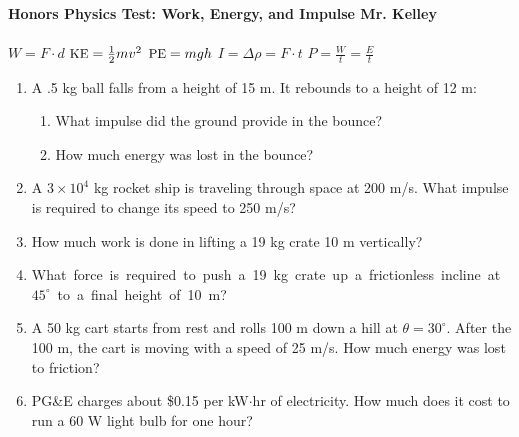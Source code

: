 \documentclass[12pt]{report}
\newcommand{\ke}{\mbox{\small KE}}
\newcommand{\pe}{\mbox{\small PE}}
\begin{document}
{\bf{Honors Physics} \hfill {Test: Work, Energy, and Impulse} \hfill {Mr. Kelley}} \\ \\
\mbox{} \hfill $W=F\cdot d$ \hfill $\ke = \frac{1}{2}mv^2$ \hfill $\pe = mgh$ \hfill $I = \Delta \rho = F\cdot t$ \hfill $P = \frac{W}{t}=\frac{E}{t}$ \hfill \mbox{}
\begin{center}
\end{center}
\begin{enumerate}
\item A .5 kg ball falls from a height of 15 m.  It rebounds to a height of 12 m:
\begin{enumerate}
\item What impulse did the ground provide in the bounce?
\item How much energy was lost in the bounce?
\end{enumerate}
\vfill
\item A $3 \times 10^4$ kg rocket ship is traveling through space at 200 m/s.  What impulse is required to change its speed to 250 m/s?
\vfill
\item How much work is done in lifting a 19 kg crate 10 m vertically?
\vfill
\item \mbox{What force is required to push a 19 kg crate up a frictionless incline at $45^\circ$ to a final height of 10 m?}
\vfill
\item A 50 kg cart starts from rest and rolls 100 m down a hill at $\theta = 30^\circ$.  After the 100 m, the cart is moving with a speed of 25 m/s.  How much energy was lost to friction?
\vfill
\item PG\&E charges about \$0.15 per kW$\cdot$hr of electricity.  How much does it cost to run a 60 W light bulb for one hour?
\vfill
\end{enumerate}
\end{document}
